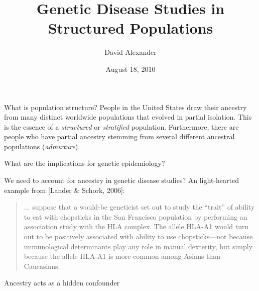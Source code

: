 \documentclass[serif,professionalfonts,svgnames]{beamer}
\title{Genetic Disease Studies in Structured Populations}
\author{David Alexander}
\date{August 18, 2010}
\begin{document}
\setlength{\parskip}{10pt plus 1pt minus 1pt}

\maketitle

\begin{frame}{What is population structure?}
  People in the United States draw their ancestry from many distinct
  worldwide populations that evolved in partial isolation. This is the
  essence of a \emph{structured} or \emph{stratified} population.
  Furthermore, there are people who have partial ancestry stemming
  from several different ancestral populations (\emph{admixture}).

  What are the implications for genetic epidemiology?  
\end{frame}

\begin{frame}{We need to account for ancestry in genetic disease studies?}
        An light-hearted example from [Lander \& Schork, 2006]:
        
\begin{quote}   
  ... suppose that a would-be geneticist set out to study the ``trait'' of ability to eat with chopsticks in the San Francisco population by performing an association study with the HLA complex. The allele HLA-A1 would turn out to be positively associated with ability to use chopsticks---not because immunological determinants play any role in manual dexterity, but simply because the allele HLA-A1 is more common among Asians than Caucasians.
\end{quote}
\end{frame}


\begin{frame}{Ancestry acts as a hidden confounder}
  \begin{center}
  \end{center}
\end{frame}
\end{document}
